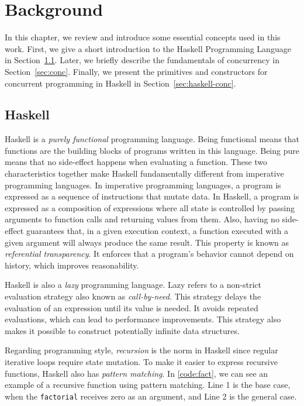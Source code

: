 \chapter{Background}
In this chapter, we review and introduce some essential concepts used in this work. First, we give a short introduction to the Haskell Programming Language in Section~\ref{sec:haskell}. Later, we briefly describe the fundamentals of concurrency in Section~\ref{sec:conc}. Finally, we present the primitives and constructors for concurrent programming in Haskell in Section~\ref{sec:haskell-conc}.

\section{Haskell}\label{sec:haskell}
Haskell is a \emph{purely functional} programming language. Being functional means that functions are the building blocks of programs written in this language. Being pure means that no side-effect happens when evaluating a function. These two characteristics together make Haskell fundamentally different from imperative programming languages. In imperative programming languages, a program is expressed as a sequence of instructions that mutate data. In Haskell, a program is expressed as a composition of expressions where all state is controlled by passing arguments to function calls and returning values from them. Also, having no side-effect guarantees that, in a given execution context, a function executed with a given argument will always produce the same result. This property is known as \emph{referential transparency}. It enforces that a program's behavior cannot depend on history, which improves reasonability.

Haskell is also a \emph{lazy} programming language. Lazy refers to a non-strict evaluation strategy also known as \emph{call-by-need}. This strategy delays the evaluation of an expression until its value is needed. It avoids repeated evaluations, which can lead to performance improvements. This strategy also makes it possible to construct potentially infinite data structures.

Regarding programming style, \emph{recursion} is the norm in Haskell since regular iterative loops require state mutation. To make it easier to express recursive functions, Haskell also has \emph{pattern matching}. In \autoref{code:fact}, we can see an example of a recursive function using pattern matching. Line 1 is the base case, when the \texttt{factorial} receives zero as an argument, and Line 2 is the general case.

